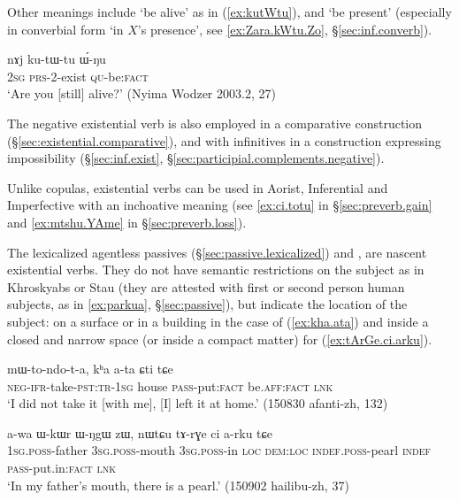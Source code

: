 Other meanings include `be alive' as in (\ref{ex:kutWtu}), and `be present' (especially in converbial form  `in $X$'s presence', see \ref{ex:Zara.kWtu.Zo}, §\ref{sec:inf.converb}). 

\begin{exe}
\ex \label{ex:kutWtu}
\gll  nɤj ku-tɯ-tu ɯ́-ŋu \\
\textsc{2sg} \textsc{prs}-2-exist \textsc{qu}-be:\textsc{fact} \\
\glt `Are you [still] alive?' (Nyima Wodzer 2003.2, 27)
\end{exe} 

The negative existential verb  is also employed in a comparative construction (§\ref{sec:existential.comparative}), and with infinitives in a construction expressing impossibility (§\ref{sec:inf.exist}, §\ref{sec:participial.complements.negative}).

Unlike copulas, existential verbs can be used in Aorist, Inferential and Imperfective with an inchoative meaning (see  \ref{ex:ci.totu} in §\ref{sec:preverb.gain} and \ref{ex:mtshu.YAme} in §\ref{sec:preverb.loss}).
 
The lexicalized agentless passives (§\ref{sec:passive.lexicalized})   and , are nascent existential verbs. They do not have semantic restrictions on the subject as in Khroskyabs or Stau (they are attested with first or second person human subjects, as in \ref{ex:parkua}, §\ref{sec:passive}), but indicate the location of the subject: on a surface or in a building in the case of  (\ref{ex:kha.ata}) and inside a closed and narrow space (or inside a compact matter) for  (\ref{ex:tArGe.ci.arku}).
 
\begin{exe}
\ex \label{ex:kha.ata}
\gll  mɯ-to-ndo-t-a,  kʰa a-ta ɕti tɕe \\
\textsc{neg}-\textsc{ifr}-take-\textsc{pst}:\textsc{tr}-\textsc{1sg} house \textsc{pass}-put:\textsc{fact} be.\textsc{aff}:\textsc{fact} \textsc{lnk} \\
\glt `I did not take it [with me], [I] left it at home.' (150830 afanti-zh, 132)
  \end{exe}
  
\begin{exe}
\ex \label{ex:tArGe.ci.arku}
\gll a-wa ɯ-kɯr ɯ-ŋgɯ zɯ, nɯtɕu tɤ-rɣe ci a-rku tɕe \\
\textsc{1sg}.\textsc{poss}-father \textsc{3sg}.\textsc{poss}-mouth \textsc{3sg}.\textsc{poss}-in \textsc{loc} \textsc{dem}:\textsc{loc} \textsc{indef}.\textsc{poss}-pearl \textsc{indef} \textsc{pass}-put.in:\textsc{fact} \textsc{lnk} \\
\glt `In my father's mouth, there is a pearl.' (150902 hailibu-zh, 37)
  \end{exe}

